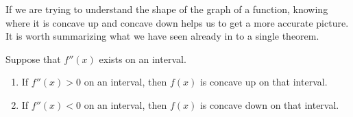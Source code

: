 





If we are trying to understand the shape of the graph of a function,
knowing where it is concave up and concave down helps us to get a more
accurate picture. It is worth summarizing what we have seen already in
to a single theorem.

\begin{mainTheorem}
Suppose that $f''(x)$ exists on an interval.
\begin{enumerate}
\item If $f''(x)>0$ on an interval, then $f(x)$ is concave up on that interval.
\item If $f''(x)<0$ on an interval, then $f(x)$ is concave down on that interval.
\end{enumerate}
\end{mainTheorem}


